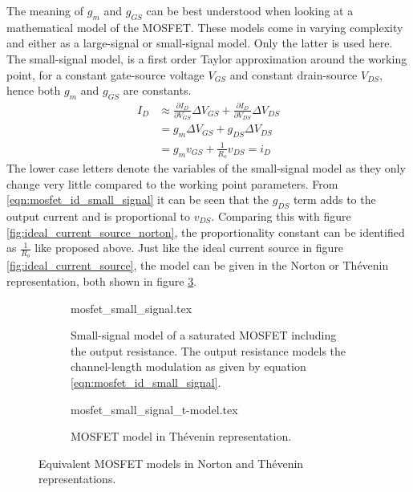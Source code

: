 The meaning of $g_{m}$ and $g_{GS}$ can be best understood when looking at a mathematical model of the MOSFET. These models come in varying complexity and either as a large-signal or small-signal model. Only the latter is used here. The small-signal model, is a first order Taylor approximation around the working point, for a constant gate-source voltage $V_{GS}$ and constant drain-source $V_{DS}$, hence both $g_{m}$ and $g_{GS}$ are constants.
\begin{align}
    I_D &\approx \frac{\partial I_D}{\partial V_{GS}} \Delta V_{GS} + \frac{\partial I_D}{\partial V_{DS}} \Delta V_{DS}\\
    &= g_{m} \Delta V_{GS} + g_{DS} \Delta V_{DS}\\
    &= g_{m} v_{GS} + \frac{1}{R_o} v_{DS} = i_D \label{eqn:mosfet_id_small_signal}
\end{align}
The lower case letters denote the variables of the small-signal model as they only change very little compared to the working point parameters.
From \ref{eqn:mosfet_id_small_signal} it can be seen that the $g_{DS}$ term adds to the output current and is proportional to $v_{DS}$. Comparing this with figure \ref{fig:ideal_current_source_norton}, the proportionality constant can be identified as $\frac{1}{R_o}$ like proposed above. Just like the ideal current source in figure \ref{fig:ideal_current_source}, the model can be given in the Norton or Thévenin representation, both shown in figure \ref{fig:mostfet_small_signa_model}.
\begin{figure}[hb]
    \centering
    \begin{subfigure}{0.43\linewidth}
        \centering
        {mosfet_small_signal.tex}
        \caption{Small-signal model of a saturated MOSFET including the output resistance. The output resistance models the channel-length modulation as given by equation \ref{eqn:mosfet_id_small_signal}.}
        \label{fig:mostfet_small_signa_model_model_norton}
    \end{subfigure}
    \begin{subfigure}{0.43\linewidth}
        \centering
        {mosfet_small_signal_t-model.tex}
        \caption{MOSFET model in Thévenin representation.}
        \label{fig:mostfet_small_signa_model_thevenin}
    \end{subfigure}
    \caption{Equivalent MOSFET models in Norton and Thévenin representations.}
    \label{fig:mostfet_small_signa_model}
\end{figure}

